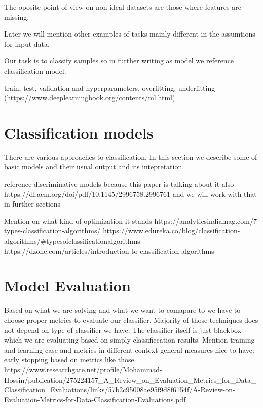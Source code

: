The oposite point of view on non-ideal datasets are those where features are missing. 

Later we will mention other examples of tasks mainly different in the assumtions for input data.


Our task is to classify samples so in further writing as model we reference classification model.

train, test, validation and hyperparameters, overfitting, underfitting (https://www.deeplearningbook.org/contents/ml.html)


\section{Classification models}
There are various approaches to classification. In this section we describe some of basic models and their usual output and its intepretation. 

reference discriminative models because this paper is talking about it also - https://dl.acm.org/doi/pdf/10.1145/2996758.2996761 and we will work with that in further sections

Mention on what kind of optimization it stands
https://analyticsindiamag.com/7-types-classification-algorithms/
https://www.edureka.co/blog/classification-algorithms/#typesofclassificationalgorithms
https://dzone.com/articles/introduction-to-classification-algorithms

\section{Model Evaluation}
Based on what we are solving and what we want to comapare to we have to choose proper metrics to evaluate our classifier. Majority of those techniques does not depend on type of classifier we have. The classifier itself is just blackbox which we are evaluating based on simply classificcation results.
Mention training and learning case and metrics in different context
general measures
nice-to-have: early stopping based on metrics like those
https://www.researchgate.net/profile/Mohammad-Hossin/publication/275224157_A_Review_on_Evaluation_Metrics_for_Data_Classification_Evaluations/links/57b2c95008ae95f9d8f6154f/A-Review-on-Evaluation-Metrics-for-Data-Classification-Evaluations.pdf

